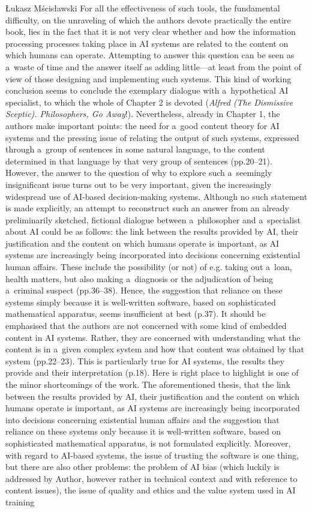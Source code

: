 \begin{newrevengenv}{Łukasz Mścisławski}
{} For all the effectiveness of such tools, the fundamental difficulty, on the unraveling of which the authors devote practically the entire book, lies in the fact that it is not very clear whether and how the information processing processes taking place in AI systems are related to the content on which humans can operate. Attempting to answer this question can be seen as a~waste of time and the answer itself as adding little---at least from the point of view of those designing and implementing such systems. This kind of working conclusion seems to conclude the exemplary dialogue with a~hypothetical AI specialist, to which the whole of Chapter 2 is devoted (\textit{Alfred (The Dismissive Sceptic). Philosophers, Go Away}!). Nevertheless, already in Chapter 1, the authors make important points: the need for a~good content theory for AI systems and the pressing issue of relating the output of such systems, expressed through a~group of sentences in some natural language, to the content determined in that language by that very group of sentences (pp.20--21). However, the answer to the question of why to explore such a~seemingly insignificant issue turns out to be very important, given the increasingly widespread use of AI-based decision-making systems. Although no such statement is made explicitly, an attempt to reconstruct such an answer from an already preliminarily sketched, fictional dialogue between a~philosopher and a~specialist about AI could be as follows: the link between the results provided by AI, their justification and the content on which humans operate is important, as AI systems are increasingly being incorporated into decisions concerning existential human affairs. These include the possibility (or not) of e.g. taking out a~loan, health matters, but also making a~diagnosis or the adjudication of being a~criminal suspect (pp.36--38). Hence, the suggestion that reliance on these systems simply because it is well-written software, based on sophisticated mathematical apparatus, seems insufficient at best (p.37). It should be emphasised that the authors are not concerned with some kind of embedded content in AI systems. Rather, they are concerned with understanding what the content is in a~given complex system and how that content was obtained by that system (pp.22--23). This is particularly true for AI systems, the results they provide and their interpretation (p.18). Here is right place to highlight is one of the minor shortcomings of the work. The aforementioned thesis, that the link between the results provided by AI, their justification and the content on which humans operate is important, as AI systems are increasingly being incorporated into decisions concerning existential human affairs and the suggestion that reliance on these systems only because it is well-written software, based on sophisticated mathematical apparatus, is not formulated explicitly. Moreover, with regard to AI-based systems, the issue of trusting the software is one thing, but there are also other problems: the problem of AI bias (which luckily is addressed by Author, however rather in technical context and with reference to content issues), the issue of quality and ethics and the value system used in AI training 

\end{newrevengenv}
